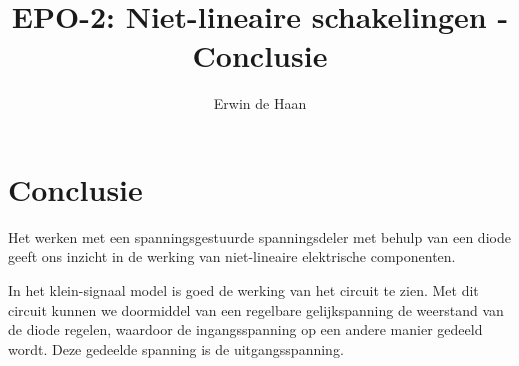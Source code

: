 \documentclass{report}
\title{EPO-2: Niet-lineaire schakelingen - Conclusie}
\author{Erwin de Haan}
\begin{document}
\chapter{Conclusie}
\label{ch:conclusie}

Het werken met een spanningsgestuurde spanningsdeler met behulp van een diode geeft ons inzicht in de werking van niet-lineaire elektrische componenten.
 
In het klein-signaal model is goed de werking van het circuit te zien. Met dit circuit kunnen we doormiddel van een regelbare gelijkspanning de weerstand van de diode regelen, waardoor de ingangsspanning op een andere manier gedeeld wordt. Deze gedeelde spanning is de uitgangsspanning.
\end{document}
